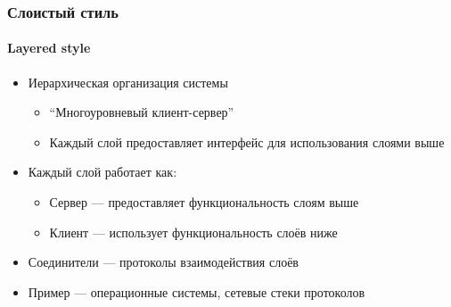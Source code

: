 \documentclass{../../slides-style}
\begin{document}
    \begin{frame}
        \frametitle{Слоистый стиль}
        \framesubtitle{Layered style}
        \begin{itemize}
            \item Иерархическая организация системы
            \begin{itemize}
                \item ``Многоуровневый клиент-сервер''
                \item Каждый слой предоставляет интерфейс для использования слоями выше
            \end{itemize}
            \item Каждый слой работает как:
            \begin{itemize}
                \item Сервер --- предоставляет функциональность слоям выше
                \item Клиент --- использует функциональность слоёв ниже
            \end{itemize}
            \item Соединители --- протоколы взаимодействия слоёв
            \item Пример --- операционные системы, сетевые стеки протоколов
        \end{itemize}
    \end{frame}
\end{document}
